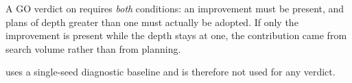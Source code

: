 A GO verdict on  requires \emph{both} conditions: an improvement must be
present, and plans of depth greater than one must actually be adopted. If only the
improvement is present while the depth stays at one, the contribution came from
search volume rather than from planning.

 uses a single-seed diagnostic baseline and is therefore not used for any
verdict.
